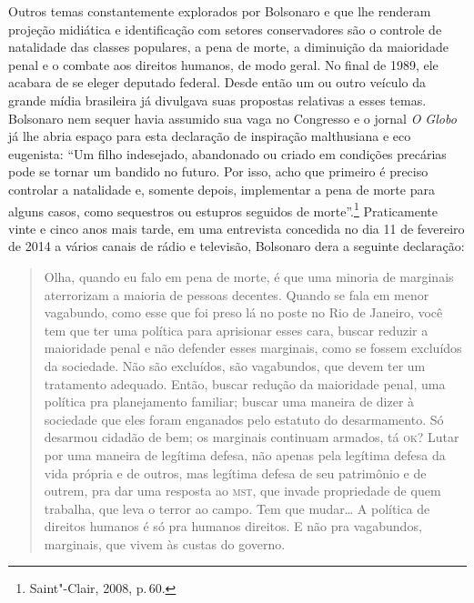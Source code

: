 Outros temas constantemente explorados por Bolsonaro e que lhe renderam
projeção midiática e identificação com setores conservadores são o
controle de natalidade das classes populares, a pena de morte, a
diminuição da maioridade penal e o combate aos direitos humanos, de modo
geral. No final de 1989, ele acabara de se eleger deputado federal.
Desde então um ou outro veículo da grande mídia brasileira já divulgava
suas propostas relativas a esses temas. Bolsonaro nem sequer havia
assumido sua vaga no Congresso e o jornal \emph{O Globo} já lhe abria
espaço para esta declaração de inspiração malthusiana e eco eugenista:
``Um filho indesejado, abandonado ou criado em condições precárias pode
se tornar um bandido no futuro. Por isso, acho que primeiro é preciso
controlar a natalidade e, somente depois, implementar a pena de morte
para alguns casos, como sequestros ou estupros seguidos de
morte''.\footnote{Saint"-Clair, 2008, p.\,60.} Praticamente vinte e cinco
anos mais tarde, em uma entrevista concedida no dia 11 de fevereiro de
2014 a vários canais de rádio e televisão, Bolsonaro dera a seguinte
declaração:

\begin{quote}
Olha, quando eu falo em pena de morte, é que uma minoria de marginais
aterrorizam a maioria de pessoas decentes. Quando se fala em menor
vagabundo, como esse que foi preso lá no poste no Rio de Janeiro, você
tem que ter uma política para aprisionar esses cara, buscar reduzir a
maioridade penal e não defender esses marginais, como se fossem
excluídos da sociedade. Não são excluídos, são vagabundos, que devem ter
um tratamento adequado. Então, buscar redução da maioridade penal, uma
política pra planejamento familiar; buscar uma maneira de dizer à
sociedade que eles foram enganados pelo estatuto do desarmamento. Só
desarmou cidadão de bem; os marginais continuam armados, tá \textsc{ok}? Lutar
por uma maneira de legítima defesa, não apenas pela legítima defesa da
vida própria e de outros, mas legítima defesa de seu patrimônio e de
outrem, pra dar uma resposta ao \textsc{mst}, que invade propriedade de quem
trabalha, que leva o terror ao campo. Tem que mudar\ldots{} A política de
direitos humanos é só pra humanos direitos. E não pra vagabundos,
marginais, que vivem às custas do governo.
\end{quote}

